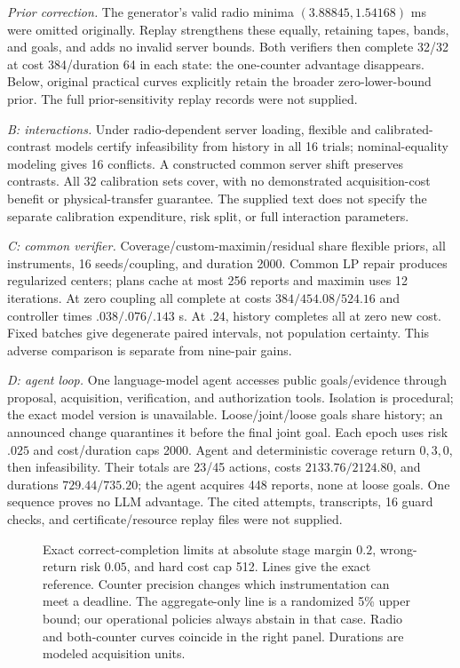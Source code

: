 \label{app:prior-sensitivity}
\emph{Prior correction.} The generator's valid radio minima $(3.88845,1.54168)$ ms were omitted originally. Replay strengthens these equally, retaining tapes, bands, and goals, and adds no invalid server bounds. Both verifiers then complete 32/32 at cost 384/duration 64 in each state: the one-counter advantage disappears. Below, original practical curves explicitly retain the broader zero-lower-bound prior. The full prior-sensitivity replay records were not supplied.

\emph{B: interactions.} Under radio-dependent server loading, flexible and calibrated-contrast models certify infeasibility from history in all 16 trials; nominal-equality modeling gives 16 conflicts. A constructed common server shift preserves contrasts. All 32 calibration sets cover, with no demonstrated acquisition-cost benefit or physical-transfer guarantee. The supplied text does not specify the separate calibration expenditure, risk split, or full interaction parameters.

\emph{C: common verifier.} Coverage/custom-maximin/residual share flexible priors, all instruments, 16 seeds/coupling, and duration 2000. Common LP repair produces regularized centers; plans cache at most 256 reports and maximin uses 12 iterations. At zero coupling all complete at costs $384/454.08/524.16$ and controller times $.038/.076/.143$ s. At $.24$, history completes all at zero new cost. Fixed batches give degenerate paired intervals, not population certainty. This adverse comparison is separate from nine-pair gains.

\emph{D: agent loop.} One language-model agent accesses public goals/evidence through proposal, acquisition, verification, and authorization tools. Isolation is procedural; the exact model version is unavailable. Loose/joint/loose goals share history; an announced change quarantines it before the final joint goal. Each epoch uses risk $.025$ and cost/duration caps 2000. Agent and deterministic coverage return $0,3,0$, then infeasibility. Their totals are 23/45 actions, costs $2133.76/2124.80$, and durations $729.44/735.20$; the agent acquires 448 reports, none at loose goals. One sequence proves no LLM advantage. The cited attempts, transcripts, 16 guard checks, and certificate/resource replay files were not supplied.

\begin{figure}[t]
\centering
\resizebox{\textwidth}{!}{}
\caption{Exact correct-completion limits at absolute stage margin $0.2$,
wrong-return risk $0.05$, and hard cost cap 512. Lines give the exact
reference. Counter precision changes
which instrumentation can meet a deadline. The aggregate-only line is a
randomized 5\% upper bound; our operational policies always abstain in
that case. Radio and both-counter curves coincide in the right panel.
Durations are modeled acquisition units.}
\label{fig:v42-scalar-frontier}
\end{figure}

